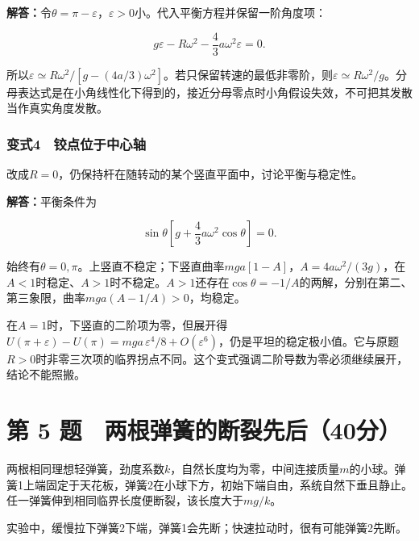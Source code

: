 \documentclass[12pt,a4paper,fontset=fandol]{ctexart}
\begin{document}
\textbf{解答：}令\(\theta=\pi-\varepsilon\)，\(\varepsilon>0\)小。代入平衡方程并保留一阶角度项：

\[
g\varepsilon-R\omega^2-\frac43a\omega^2\varepsilon=0.
\]

所以\(\varepsilon\simeq R\omega^2/[g-(4a/3)\omega^2]\)。若只保留转速的最低非零阶，则\(\varepsilon\simeq R\omega^2/g\)。分母表达式是在小角线性化下得到的，接近分母零点时小角假设失效，不可把其发散当作真实角度发散。

\subsubsection{变式4　铰点位于中心轴}\label{ux53d8ux5f0f4-ux94f0ux70b9ux4f4dux4e8eux4e2dux5fc3ux8f74}

改成\(R=0\)，仍保持杆在随转动的某个竖直平面中，讨论平衡与稳定性。

\textbf{解答：}平衡条件为

\[
\sin\theta\left[g+\frac43a\omega^2\cos\theta\right]=0.
\]

始终有\(\theta=0,\pi\)。上竖直不稳定；下竖直曲率\(mga[1-A]\)，\(A=4a\omega^2/(3g)\)，在\(A<1\)时稳定、\(A>1\)时不稳定。\(A>1\)还存在\(\cos\theta=-1/A\)的两解，分别在第二、第三象限，曲率\(mga(A-1/A)>0\)，均稳定。

在\(A=1\)时，下竖直的二阶项为零，但展开得\(U(\pi+\varepsilon)-U(\pi)=mga\,\varepsilon^4/8+O(\varepsilon^6)\)，仍是平坦的稳定极小值。它与原题\(R>0\)时非零三次项的临界拐点不同。这个变式强调二阶导数为零必须继续展开，结论不能照搬。

\clearpage

\section{第 5
题　两根弹簧的断裂先后（40分）}\label{ux7b2c-5-ux9898-ux4e24ux6839ux5f39ux7c27ux7684ux65adux88c2ux5148ux540e40ux5206}

两根相同理想轻弹簧，劲度系数\(k\)，自然长度均为零，中间连接质量\(m\)的小球。弹簧1上端固定于天花板，弹簧2在小球下方，初始下端自由，系统自然下垂且静止。任一弹簧伸到相同临界长度便断裂，该长度大于\(mg/k\)。

实验中，缓慢拉下弹簧2下端，弹簧1会先断；快速拉动时，很有可能弹簧2先断。
\end{document}
